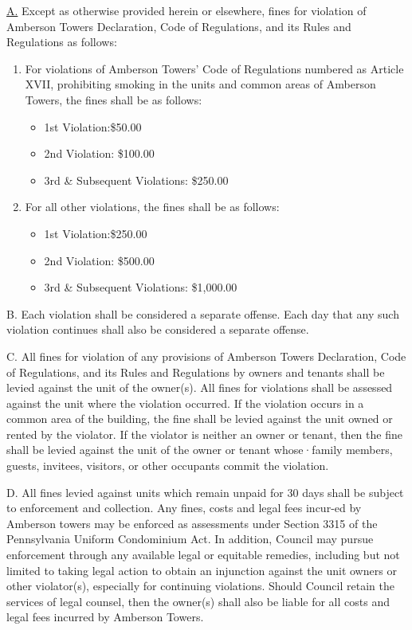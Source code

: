 \documentclass[
  14pt,
]{book}
\providecommand{\tightlist}{%
  \setlength{\itemsep}{0pt}\setlength{\parskip}{0pt}}
\begin{document}
\protect\hyperlink{ArtIX}{A.} Except as otherwise provided herein or elsewhere, fines for violation of Amberson Towers Declaration, Code of Regulations, and its Rules and Regulations as follows:

\begin{enumerate}
\def\labelenumi{\arabic{enumi}.}
\tightlist
\item
  For violations of Amberson Towers' Code of Regulations numbered as Article XVII, prohibiting smoking in the units and common areas of Amberson Towers, the fines shall be as follows:

  \begin{itemize}
  \tightlist
  \item
    1st Violation:\$50.00
  \item
    2nd Violation: \$100.00
  \item
    3rd \& Subsequent Violations: \$250.00
  \end{itemize}
\item
  For all other violations, the fines shall be as follows:

  \begin{itemize}
  \tightlist
  \item
    1st Violation:\$250.00
  \item
    2nd Violation: \$500.00
  \item
    3rd \& Subsequent Violations: \$1,000.00
  \end{itemize}
\end{enumerate}

B. Each violation shall be considered a separate offense. Each day that any such violation continues shall also be considered a separate offense.

C. All fines for violation of any provisions of Amberson Towers Declaration, Code of Regulations, and its Rules and Regulations by owners and tenants shall be levied against the unit of the owner(s). All fines for violations shall be assessed against the unit where the violation occurred. If the violation occurs in a common area of the building, the fine shall be levied against the unit owned or rented by the violator. If the violator is neither an owner or tenant, then the fine shall be levied against the unit of the owner or tenant whose·family members, guests, invitees, visitors, or other occupants commit the violation.

D. All fines levied against units which remain unpaid for 30 days shall be subject to enforcement and collection. Any fines, costs and legal fees incur-ed by Amberson towers may be enforced as assessments under Section 3315 of the Pennsylvania Uniform Condominium Act. In addition, Council may pursue enforcement through any available legal or equitable remedies, including but not limited to taking legal action to obtain an injunction against the unit owners or other violator(s), especially for continuing violations. Should Council retain the services of legal counsel, then the owner(s) shall also be liable for all costs and legal fees incurred by Amberson Towers.
\end{document}
